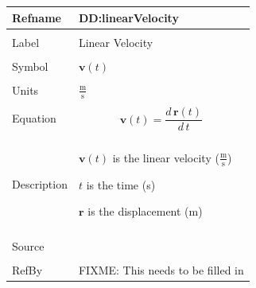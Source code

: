 \documentclass[12pt]{article}
\begin{document}
\noindent \begin{minipage}{\textwidth}
\begin{tabular}{p{} p{}}
\toprule \textbf{Refname} & \textbf{DD:linearVelocity}
\label{DD:linearVelocity}
\\ \midrule \\
Label & Linear Velocity
\\ \midrule \\
Symbol & $\mathbf{v}(t)$
\\ \midrule \\
Units & $\frac{\text{m}}{\text{s}}$
\\ \midrule \\
Equation & \begin{dmath}
           \mathbf{v}(t)=\frac{d\,\mathbf{r}\left(t\right)}{d\,t}
           \end{dmath}
\\ \midrule \\
Description & \begin{symbDescription}
              \item{$\mathbf{v}(t)$ is the linear velocity ($\frac{\text{m}}{\text{s}}$)}
              \item{$t$ is the time (s)}
              \item{$\mathbf{r}$ is the displacement (m)}
              \end{symbDescription}
\\ \midrule \\
Source & 
\\ \midrule \\
RefBy & FIXME: This needs to be filled in
\\ \bottomrule \end{tabular}
\end{minipage}\\
~\newline
\end{document}
